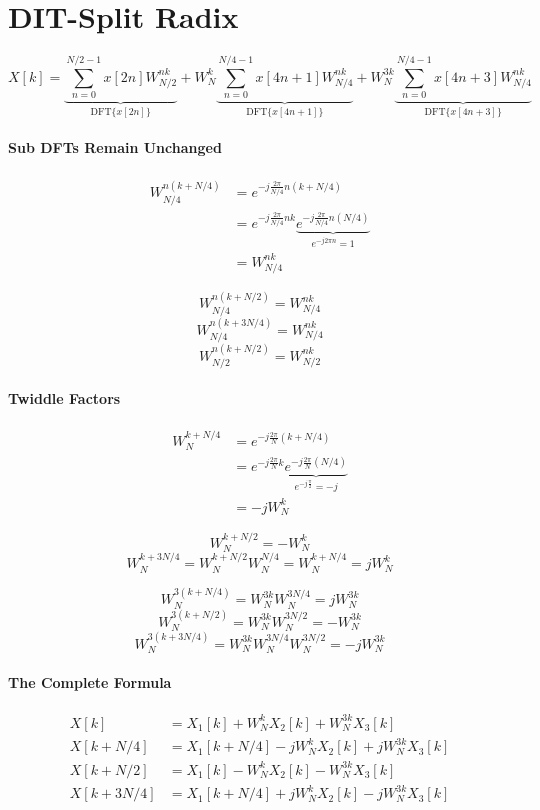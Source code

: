 \documentclass[11pt]{article}
\begin{document}
\section{DIT-Split Radix}

\[X[k] = \underbrace{\sum_{n=0}^{N/2-1} x[2n] W_{N/2}^{nk}}_{\text{DFT}\{x[2n]\}}
       + W_N^k \underbrace{\sum_{n=0}^{N/4-1} x[4n+1] W_{N/4}^{nk}}_{\text{DFT}\{x[4n+1]\}}
       + W_N^{3k} \underbrace{\sum_{n=0}^{N/4-1} x[4n+3] W_{N/4}^{nk}}_{\text{DFT}\{x[4n+3]\}}\]

\paragraph{Sub DFTs Remain Unchanged}

\[\begin{split}
W_{N/4}^{n(k+N/4)} & = e^{-j\frac{2\pi}{N/4}n(k+N/4)} \\
& = e^{-j\frac{2\pi}{N/4}nk} \underbrace{e^{-j\frac{2\pi}{N/4}n(N/4)}}_{ e^{-j2\pi n} = 1} \\
& = W_{N/4}^{nk}
\end{split}\]

\[W_{N/4}^{n(k+N/2)} = W_{N/4}^{nk}\]
\[W_{N/4}^{n(k+3N/4)} = W_{N/4}^{nk}\]
\[W_{N/2}^{n(k+N/2)} = W_{N/2}^{nk}\]

\paragraph{Twiddle Factors}

\[\begin{split}
W_N^{k+N/4} & = e^{-j\frac{2\pi}{N}(k+N/4)} \\
& = e^{-j\frac{2\pi}{N}k} \underbrace{e^{-j\frac{2\pi}{N}(N/4)}}_{ e^{-j\frac{\pi}{2}} = -j} \\
& = -j W_{N}^k
\end{split}\]

\[W_N^{k+N/2} = -W_N^k\]
\[W_N^{k+3N/4} = W_N^{k+N/2} W_N^{N/4} = W_N^{k+N/4} = j W_{N}^k\]

\bigskip

\[W_N^{3(k+N/4)} = W_N^{3k} W_N^{3N/4} = j W_N^{3k}\]
\[W_N^{3(k+N/2)} = W_N^{3k} W_N^{3N/2} = -W_N^{3k}\]
\[W_N^{3(k+3N/4)} = W_N^{3k} W_N^{3N/4} W_N^{3N/2} = -j W_N^{3k}\]

\paragraph{The Complete Formula}

\[\begin{split}
  X[k] & = X_1[k] + W_N^k X_2[k] + W_N^{3k} X_3[k]\\
  X[k + N/4] & = X_1[k + N/4] - jW_N^k X_2[k] + jW_N^{3k} X_3[k] \\
  X[k + N/2] & = X_1[k] - W_N^k X_2[k] - W_N^{3k} X_3[k] \\
  X[k + 3N/4] & = X_1[k + N/4] + jW_N^k X_2[k] - jW_N^{3k} X_3[k] \\
\end{split}\]
\end{document}
